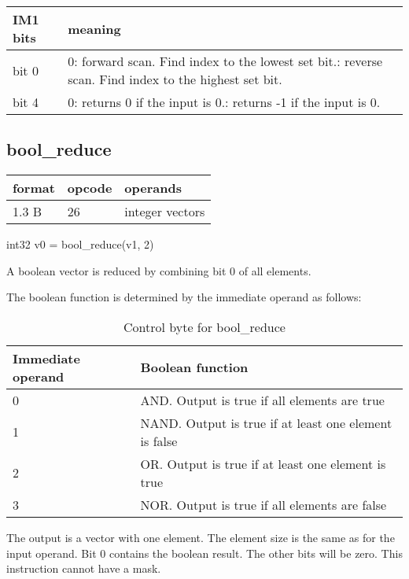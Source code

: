 \documentclass[forwardcom.tex]{subfiles}
\begin{document}
\label{table:bitscanOptions}
\begin{tabular}{|p{16mm}|p{122mm}|}
\hline
\bfseries IM1 bits & \bfseries meaning \\ \hline
bit 0 & 0: forward scan. Find index to the lowest set bit.\newline
        1: reverse scan. Find index to the highest set bit.\\
\hline
bit 4 & 0: returns  0 if the input is 0.\newline
        1: returns -1 if the input is 0.\\ \hline
\end{tabular}
\vv


\subsection{bool\_reduce}
\label{table:boolReduceInstruction}
\begin{tabular}{|p{12mm}|p{15mm}|p{100mm}|}
\hline
\bfseries format & \bfseries opcode & \bfseries operands \\ \hline
1.3 B & 26 & integer vectors \\ \hline
\end{tabular}
\vv

int32 v0 = bool\_reduce(v1, 2)
\vv

A boolean vector is reduced by combining bit 0 of all elements.
\vv

The boolean function is determined by the immediate operand as follows:
\begin{longtable} {|p{20mm}|p{75mm}|}
\caption{Control byte for bool\_reduce} 
\label{table:ControlByteForBoolReduce} \\
\endfirsthead
\endhead
\hline
\bfseries Immediate operand & \bfseries Boolean function  \\
\hline
0 & AND. Output is true if all elements are true \\
\hline
1 & NAND. Output is true if at least one element is false \\
\hline
2 & OR. Output is true if at least one element is true \\
\hline
3 & NOR. Output is true if all elements are false \\
\hline
\end{longtable}

The output is a vector with one element. The element size is the same as for the input operand. Bit 0 contains the boolean result. The other bits will be zero. 
This instruction cannot have a mask.
\vv
\end{document}
